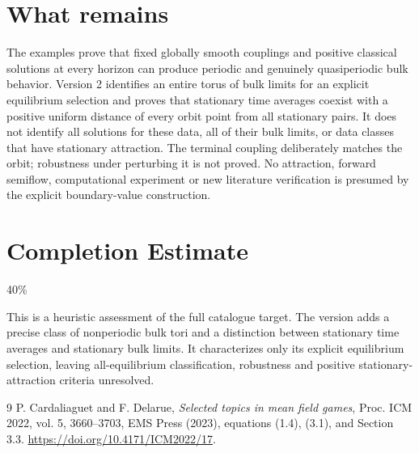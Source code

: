 \documentclass[11pt]{article}
\begin{document}
\section{What remains}
The examples prove that fixed globally smooth couplings and positive
classical solutions at every horizon can produce periodic and genuinely
quasiperiodic bulk behavior. Version 2 identifies an entire torus of bulk
limits for an explicit equilibrium selection and proves that stationary
time averages coexist with a positive uniform distance of every orbit
point from all stationary pairs. It does not identify all solutions for
these data, all of their bulk limits, or data classes that have stationary
attraction. The terminal coupling deliberately matches the orbit;
robustness under perturbing it is not proved. No attraction, forward
semiflow, computational experiment or new literature verification is
presumed by the explicit boundary-value construction.

\section{Completion Estimate}
40\%

This is a heuristic assessment of the full catalogue target. The version
adds a precise class of nonperiodic bulk tori and a distinction between
stationary time averages and stationary bulk limits. It characterizes
only its explicit equilibrium selection, leaving all-equilibrium
classification, robustness and positive stationary-attraction criteria
unresolved.

\begin{thebibliography}{9}
 P. Cardaliaguet and F. Delarue, \emph{Selected topics in mean field games}, Proc. ICM 2022, vol. 5, 3660--3703, EMS Press (2023), equations (1.4), (3.1), and Section 3.3. \url{https://doi.org/10.4171/ICM2022/17}.
\end{thebibliography}
\end{document}
